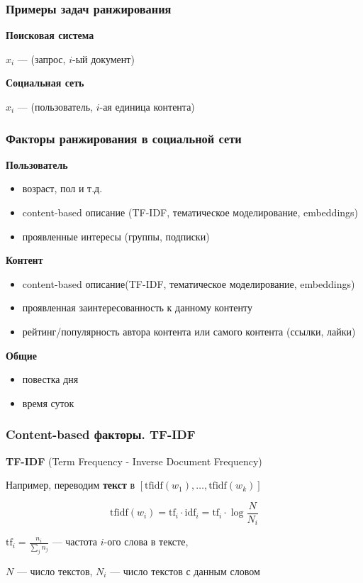\documentclass[fullscreen=true, bookmarks=true, hyperref={pdfencoding=unicode}]{beamer}
\begin{document}
\begin{frame}
  \frametitle{Примеры задач ранжирования}

  {\bf Поисковая система}

  $x_i$ — (запрос, $i$-ый документ)

  \pause
  \vspace{1cm}
  {\bf Социальная сеть}

    $x_i$ — (пользователь, $i$-ая единица контента)
\end{frame}


\begin{frame}
  \frametitle{Факторы ранжирования в социальной сети}

  {\bf Пользователь}
  \begin{itemize}
    \item возраст, пол и т.д.
    \item content-based описание (TF-IDF, тематическое моделирование, embeddings)
    \item проявленные интересы (группы, подписки)
  \end{itemize}
  \pause
  {\bf Контент}
  \begin{itemize}
    \item content-based описание(TF-IDF, тематическое моделирование, embeddings)
    \item проявленная заинтересованность к данному контенту
    \item рейтинг/популярность автора контента или самого контента (ссылки, лайки)
  \end{itemize}
  \pause
  {\bf Общие}
  \begin{itemize}
    \item повестка дня
    \item время суток
  \end{itemize}
\end{frame}


\begin{frame}
  \frametitle{Content-based факторы. TF-IDF}

  {\bf TF-IDF} (Term Frequency - Inverse Document Frequency)

  Например, переводим {\bf текст} в $[\text{tfidf}(w_1), \dots, \text{tfidf}(w_k)]$

  $$ \text{tfidf}(w_i) = \text{tf}_i \cdot \text{idf}_i = \text{tf}_i \cdot \log{\frac{N}{N_i}} $$

  $ \text{tf}_i = \frac{n_i}{\sum\limits_j n_j} $ — частота $i$-ого слова в тексте,

  $N$ — число текстов, $N_i$ — число текстов с данным словом
\end{frame}
\end{document}
